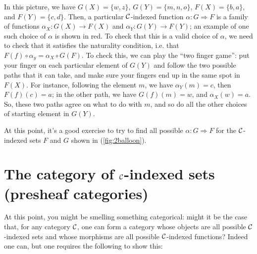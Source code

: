 In this picture, 
we have $G(X) = \{w, z\}$, $G(Y) = \{m, n, o\}$, $F(X) = \{b, a\}$, 
and $F(Y) = \{c, d\}$. 
Then, a particular $\mathcal C$-indexed function $\alpha : G \Rightarrow F$ is a family 
of functions $\alpha_X : G(X) \to F(X)$  and $\alpha_Y : G(Y) \to F(Y)$;
an example of one such choice of $\alpha$ is shown in red. To check that this is a valid 
choice of $\alpha$, we need to check that it satisfies the naturality condition, 
i.e. that $F(f) \circ \alpha_y = \alpha_X \circ G(F)$. To check this, we can play the 
``two finger game'': put your finger on each particular element of $G(Y)$ and 
follow the two possible paths that it can take, and make sure your fingers 
end up in the same spot in $F(X)$. For instance, following the element $m$, 
we have $\alpha_Y(m) = c$, then $F(f)(c) = a$; in the other path, 
we have $G(f)(m) = w$, and $\alpha_X(w) = a$. So, these two paths agree on 
what to do with $m$, and so 
do all the other choices of starting element in $G(Y)$.

At this point, it's a good exercise to try to find all possible $\alpha : G \Rightarrow F$
for the $\mathcal C$-indexed sets $F$ and $G$ shown in (\ref{fig:2balloon}).

\section{The category of $\mathcal C$-indexed sets (presheaf categories)}

At this point, you might be smelling something categorical: 
might it be the case that, for any category $\mathcal C$, 
one can form a category whose objects are all possible $\mathcal C$-indexed 
sets and whose morphisms are all possible $\mathcal C$-indexed functions? 
Indeed one can, but one requires the following to show this:

